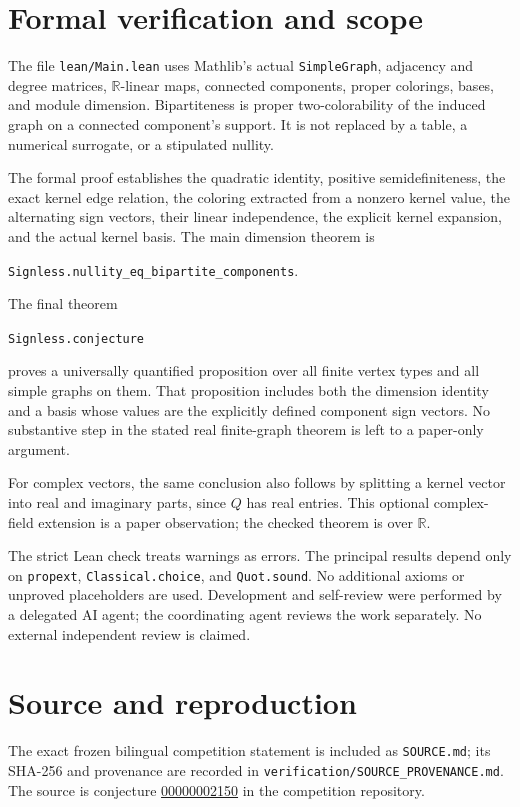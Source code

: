 \documentclass[11pt]{article}
\begin{document}
\section{Formal verification and scope}
The file \texttt{lean/Main.lean} uses Mathlib's actual
\texttt{SimpleGraph}, adjacency and degree matrices,
$\mathbb R$-linear maps, connected components, proper colorings, bases,
and module dimension. Bipartiteness is proper two-colorability of the
induced graph on a connected component's support. It is not replaced
by a table, a numerical surrogate, or a stipulated nullity.

The formal proof establishes the quadratic identity, positive
semidefiniteness, the exact kernel edge relation, the coloring extracted
from a nonzero kernel value, the alternating sign vectors, their linear
independence, the explicit kernel expansion, and the actual kernel
basis. The main dimension theorem is
\begin{center}
\texttt{Signless.nullity\_eq\_bipartite\_components}.
\end{center}
The final theorem
\begin{center}
\texttt{Signless.conjecture}
\end{center}
proves a universally quantified proposition over all finite vertex
types and all simple graphs on them. That proposition includes both
the dimension identity and a basis whose values are the explicitly
defined component sign vectors. No substantive step in the stated real
finite-graph theorem is left to a paper-only argument.

For complex vectors, the same conclusion also follows by splitting a
kernel vector into real and imaginary parts, since $Q$ has real entries.
This optional complex-field extension is a paper observation; the
checked theorem is over $\mathbb R$.

The strict Lean check treats warnings as errors. The principal results
depend only on \texttt{propext}, \texttt{Classical.choice}, and
\texttt{Quot.sound}. No additional axioms or unproved placeholders are
used. Development and self-review were performed by a delegated AI
agent; the coordinating agent reviews the work separately. No external
independent review is claimed.

\section{Source and reproduction}
The exact frozen bilingual competition statement is included as
\texttt{SOURCE.md}; its SHA-256 and provenance are recorded in
\texttt{verification/SOURCE\_PROVENANCE.md}. The source is conjecture
\href{https://github.com/The-Last-Math-Competition/The-Last-Math-Competition/blob/main/conjectures/00000002150.md}{00000002150}
in the competition repository.
\end{document}

